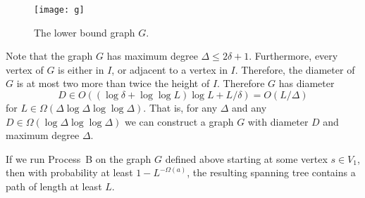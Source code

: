 \documentclass[lotsofwhite]{patmorin}
\begin{document}
\begin{figure}
  \begin{center}
    \texttt{[image: g]}
  \end{center}
  \caption{The lower bound graph $G$.}
\end{figure}

Note that the graph $G$ has maximum degree $\Delta\le 2\delta+1$.
Furthermore, every vertex of $G$ is either in $I$, or adjacent to a
vertex in $I$.  Therefore, the diameter of $G$ is at most two more than
twice the height of $I$. Therefore $G$ has diameter
\[
   D\in O((\log\delta + \log\log L)\log L + L/\delta) = O(L/\Delta)
\]
for $L\in\Omega(\Delta\log\Delta\log\log\Delta)$.  That is, for any
$\Delta$ and any $D\in\Omega(\log\Delta\log\log\Delta)$ we can construct
a graph $G$ with diameter $D$ and maximum degree $\Delta$.

\begin{thm}
  If we run Process~B on the graph $G$ defined above starting at some
  vertex $s\in V_1$, then with probability at least $1-L^{-\Omega(a)}$,
  the resulting spanning tree contains a path of length at least $L$.
\end{thm}
\end{document}
